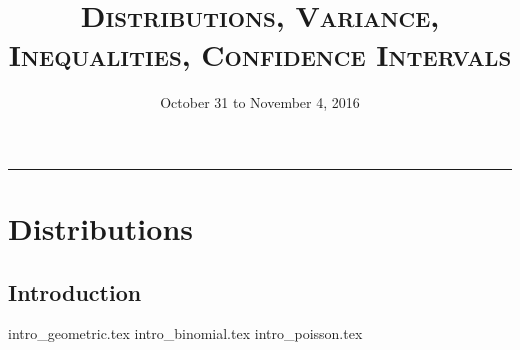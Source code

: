 \documentclass{exam}
\title{\textsc{Distributions, Variance, Inequalities, Confidence Intervals}}
\date{October 31 to November 4, 2016}
\begin{document}
\maketitle
\rule{\textwidth}{0.15em}
\fontsize{12}{15}\selectfont
\thispagestyle{empty}





\section{Distributions}
\subsection{Introduction}
{intro_geometric.tex}
{intro_binomial.tex}
{intro_poisson.tex}
\end{document}
